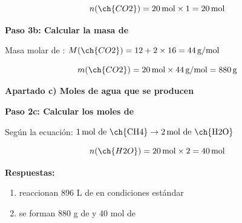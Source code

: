 \begin{exercise}
\begin{solu}
        \begin{equation*}
            n(\ch{CO2}) = 20\,\text{mol} \times 1 = 20\,\text{mol}
        \end{equation*}

        \textbf{Paso 3b: Calcular la masa de }

        Masa molar de : $M(\ch{CO2}) = 12 + 2 \times 16 = 44\,\text{g/mol}$

        \begin{equation*}
            m(\ch{CO2}) = 20\,\text{mol} \times 44\,\text{g/mol} = 880\,\text{g}
        \end{equation*}

        \textbf{Apartado c) Moles de agua que se producen}

        \textbf{Paso 2c: Calcular los moles de }

        Según la ecuación: $1\,\text{mol de \ch{CH4}} \rightarrow 2\,\text{mol de \ch{H2O}}$

        \begin{equation*}
            n(\ch{H2O}) = 20\,\text{mol} \times 2 = 40\,\text{mol}
        \end{equation*}

        \textbf{Respuestas:}
        \begin{enumerate}[label=\letraminuscula]
            \item reaccionan 896 L de  en condiciones estándar
            \item se forman 880 g de  y 40 mol de 
        \end{enumerate}
    \end{solu}
\end{exercise}

